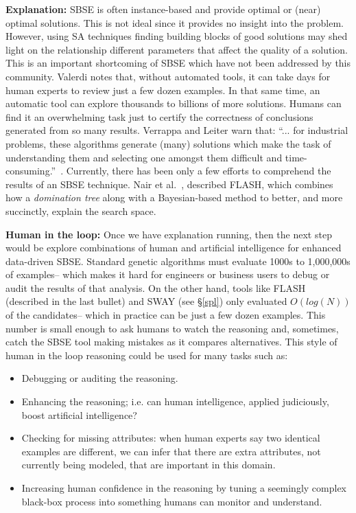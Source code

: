 \documentclass[sigconf,anonymous,review]{acmart}
\begin{document}
  \noindent\textbf{Explanation: } SBSE is often instance-based and provide optimal or (near) optimal solutions. This is not ideal since it provides no insight into the problem. However, using SA techniques finding
building blocks of good solutions may shed light on the relationship
different parameters that affect the quality of a solution. This is an important shortcoming of SBSE which have not been addressed by this community. Valerdi
notes that, without automated tools, it can take days for human
experts to review just a few dozen examples. In that same
time, an automatic tool can explore thousands to billions of more
solutions. Humans can find it an overwhelming task just to
certify the correctness of conclusions generated from so many
results. Verrappa and Leiter warn that:
``... for industrial problems, these algorithms generate
(many) solutions which make the task of understanding
them and selecting one amongst them difficult
and time-consuming.''~\cite{veerappa2011understanding}. Currently, there has been only a few efforts to comprehend the results of an SBSE technique. Nair et al.~\cite{nair2017flash}, described FLASH, which
combines   how a \textit{domination tree} along with a Bayesian-based method to better, and more succinctly,
explain the search space. 

 \noindent\textbf{Human in the loop: } Once we have explanation running, then the next step would be explore
combinations of human and artificial intelligence for
enhanced data-driven SBSE.
Standard
genetic algorithms must evaluate 1000s to 1,000,000s of examples-- which makes it hard for engineers or business users to debug or audit the results of that analysis. On the 
other hand, tools like FLASH (described in the last bullet)
and SWAY (see \S\ref{spl}) only evaluated $O(log(N))$ of the candidates-- which in practice can be just a few dozen examples. This number is small enough to ask humans
to watch the reasoning and, sometimes, catch the SBSE
tool making mistakes as it compares alternatives.  This style of human in the loop reasoning could be used for many tasks such as:
\begin{itemize}
\item Debugging or auditing the reasoning.
\item Enhancing the reasoning; i.e. can human intelligence, applied judiciously,  boost artificial intelligence?
\item Checking for missing attributes: when human experts say two identical examples are different, we can infer that there are extra attributes, not currently being modeled, that are important in this domain.
\item Increasing human  confidence in the reasoning by tuning a seemingly complex black-box process into something
humans can monitor and understand.
\end{itemize}
\end{document}
